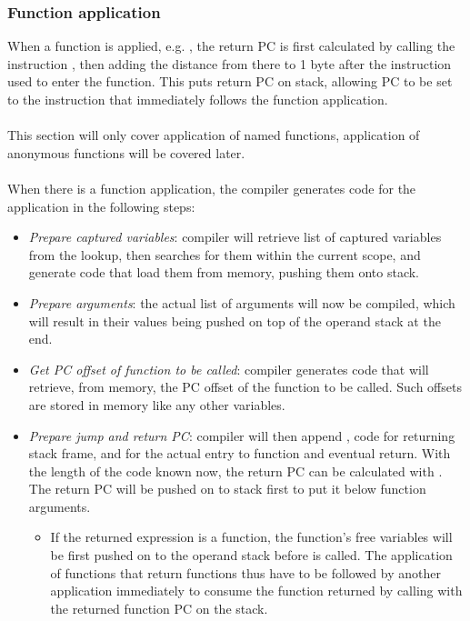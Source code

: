 \subsubsection{Function application}
When a function is applied, e.g. , the return PC is first calculated by calling the instruction , then adding the distance from there to 1 byte after the  instruction used to enter the function. This puts return PC on stack, allowing PC to be set to the instruction that immediately follows the function application. \\\\
This section will only cover application of named functions, application of anonymous functions will be covered later. \\\\
When there is a function application, the compiler generates code for the application in the following steps: 
\begin{itemize}
    \item \textit{Prepare captured variables}: compiler will retrieve list of captured variables from the lookup, then searches for them within the current scope, and generate code that load them from memory, pushing them onto stack. 
    \item \textit{Prepare arguments}: the actual list of arguments will now be compiled, which will result in their values being pushed on top of the operand stack at the end. 
    \item \textit{Get PC offset of function to be called}: compiler generates code that will retrieve, from memory, the PC offset of the function to be called. Such offsets are stored in memory like any other variables. 
    \item \textit{Prepare jump and return PC}: compiler will then append , code for returning stack frame, and  for the actual entry to function and eventual return. With the length of the code known now, the return PC can be calculated with . The return PC will be pushed on to stack first to put it below function arguments. 
        \begin{itemize}
            \item If the returned expression is a function, the function's free variables will be first pushed on to the operand stack before  is called. The application of functions that return functions thus have to be followed by another application immediately to consume the function returned by calling  with the returned function PC on the stack. 
        \end{itemize}
\end{itemize}
